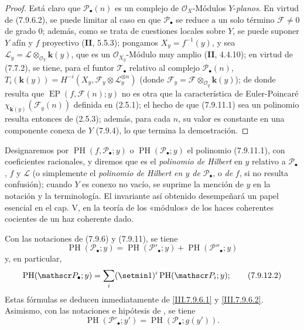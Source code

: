 \begin{proof}
Está claro que $\mathscr P_\bullet(n)$ es un complejo de
$\mathscr O_X$-Módulos $Y$-\emph{planos}. En virtud de (7.9.6.2), se puede limitar al caso
en que $\mathscr P_\bullet$ se reduce a un solo término $\mathscr F\ne0$ de grado 0;
además, como se trata de cuestiones locales sobre $Y$, se puede suponer $Y$
afín y $f$ proyectivo (\textbf{II}, 5.5.3); pongamos $X_y=f^{-1}(y)$, y sea
$\mathscr L_y=\mathscr L\otimes_{\mathscr O_Y}\boldsymbol{k}(y)$, que es un
$\mathscr O_{X_y}$-Módulo muy amplio (\textbf{II}, 4.4.10); en virtud de (7.7.2), se tiene,
para el funtor $\mathscr T_\bullet$ relativo al complejo
$\mathscr P_\bullet(n)$, $T_i(\boldsymbol{k}(y))=H^{-i}(X_y,\mathscr F_y\otimes\mathscr L_y^{\otimes n})$
(donde $\mathscr F_y=\mathscr F\otimes_{\mathscr O_y}\boldsymbol{k}(y)$);
de donde resulta que $\operatorname{EP}(f,\mathscr F(n);y)$ no es otra que la
característica de Euler-Poincaré $\chi_{\mathbf{k}(y)}(\mathscr F_y(n))$ definida en
(2.5.1); el hecho de que (7.9.11.1) sea un polinomio resulta entonces de (2.5.3);
además, para cada $n$, su valor es constante en una componente conexa de
$Y$ (7.9.4), lo que termina la demostración.
\end{proof}

Designaremos por $\operatorname{PH}(f,\mathscr P_\bullet;y)$ o
$\operatorname{PH}(\mathscr P_\bullet;y)$ el polinomio (7.9.11.1), con coeficientes
racionales, y diremos que es el \emph{polinomio de Hilbert} en $y$
relativo a $\mathscr P_\bullet$, $f$ y $\mathscr L$ (o simplemente el
\emph{polinomio de Hilbert en $y$ de $\mathscr P_\bullet$}, o \emph{de} $f$, si no
resulta confusión); cuando $Y$ es conexo no vacío, se suprime la
mención de $y$ en la notación y la terminología. El invariante así obtenido
desempeñará un papel esencial en el cap. V, en la teoría de los «módulos» de los
haces coherentes cocientes de un haz coherente dado.

\begin{env}[7.9.12]
\label{III.7.9.12.fr}
Con las notaciones de (7.9.6) y (7.9.11), se tiene
\[
  \operatorname{PH}(\mathscr P_\bullet;y)
  =\operatorname{PH}(\mathscr P'_\bullet;y)
  +\operatorname{PH}(\mathscr P''_\bullet;y)
  \tag{7.9.12.1}\label{III.7.9.12.1.fr}
\]
y, en particular,
\[
  \operatorname{PH}(\mathscr P_\bullet;y)
  =\sum_i(\setmin 1)^i\operatorname{PH}(\mathscr P_i;y) ;
  \tag{7.9.12.2}\label{III.7.9.12.2.fr}
\]
Estas fórmulas se deducen inmediatamente de
\eqref{III.7.9.6.1} y \eqref{III.7.9.6.2}. Asimismo, con las
notaciones e hipótesis de , se tiene
\[
  \operatorname{PH}(\mathscr P'_\bullet;y')
  =\operatorname{PH}(\mathscr P_\bullet;g(y')).
  \tag{7.9.12.3}\label{III.7.9.12.3.fr}
\]
\end{env}

